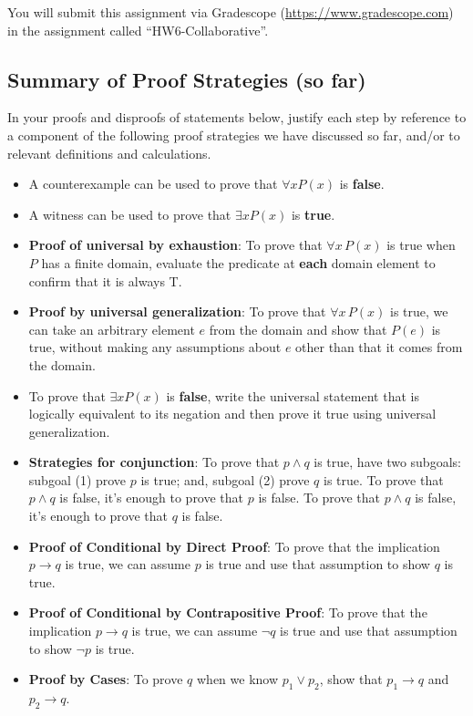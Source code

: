 \documentclass[12pt, oneside]{article}
\begin{document}
You will submit this assignment via Gradescope
(\href{https://www.gradescope.com}{https://www.gradescope.com}) in the assignment called ``HW6-Collaborative''.

\newpage

\subsection*{Summary of Proof Strategies (so far)}
In your proofs and disproofs of statements below, justify each  step
by reference to  a component of the  following proof  strategies
we  have discussed so far, and/or to relevant definitions and calculations.
\begin{itemize}
    \item A counterexample can be used to prove that  $\forall x P(x)$ is {\bf false}.
    \item  A witness can be used  to  prove that  $\exists x P(x)$ is {\bf true}.
    \item {\bf Proof of universal by exhaustion}: To prove that $\forall x \, P(x)$
is true when $P$ has a finite domain, evaluate the predicate at {\bf each} domain element to confirm that it is always T.
    \item  {\bf Proof by universal generalization}: To prove that $\forall x \, P(x)$
is true, we can take an arbitrary element $e$ from the domain and show that $P(e)$ is true, without making any assumptions about $e$ other than that it comes from the domain.
    \item To  prove  that $\exists x P(x)$ is {\bf false}, write the universal statement that is logically equivalent to its negation and then prove it true using universal generalization.
    \item {\bf Strategies for conjunction}: To prove that $p \land q$ is true, have two subgoals: subgoal (1) prove $p$ 
is  true; and, subgoal (2) prove $q$ is true. To prove that $p \land q$ is false, it's enough to prove that $p$ is false.
 To prove that $p \land q$ is false, it's enough to prove that $q$ is false.
    \item {\bf Proof of Conditional by Direct Proof}: To prove that the implication $p \to q$ is true, we can assume $p$ is true and use that assumption to show $q$ is true.
    \item {\bf Proof of Conditional by Contrapositive Proof}: To prove that the implication $p \to q$ is true, we can assume $\neg q$ is true and use that assumption to show $\neg p$ is true.
    \item {\bf Proof by Cases}: To prove $q$ when we know $p_1 \lor p_2$, show that $p_1 \to q$ and $p_2 \to q$.
\end{itemize}
\end{document}
